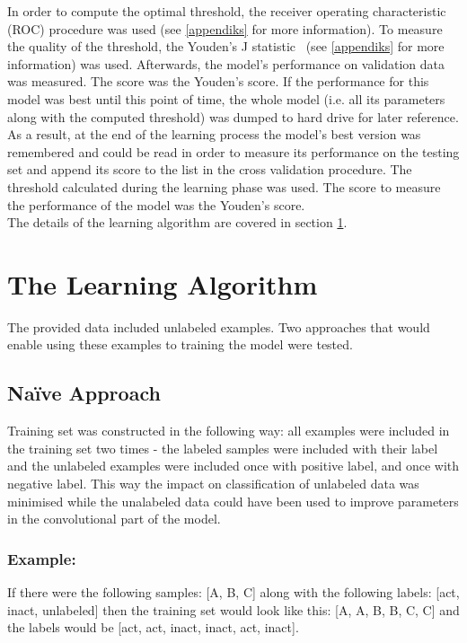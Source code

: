 \documentclass[a4paper,10pt]{report}
\begin{document}
	In order to compute the optimal threshold, the receiver operating characteristic (ROC) procedure was used (see \ref{appendiks} for more information). To measure the quality of the threshold, the Youden's J statistic~\cite{YOUDEN} (see \ref{appendiks} for more information) was used. Afterwards, the model's performance on validation data was measured. The score was the Youden's score. If the performance for this model was best until this point of time, the whole model (i.e. all its parameters along with the computed threshold) was dumped to hard drive for later reference. As a result, at the end of the learning process the model's best version was remembered and could be read in order to measure its performance on the testing set and append its score to the list in the cross validation procedure. The threshold calculated during the learning phase was used. The score to measure the performance of the model was the Youden's score.\\
	
	The details of the learning algorithm are covered in section \ref{sec:learning_algorithm}.	
	
      
    \section{The Learning Algorithm}\label{sec:learning_algorithm} 
    The provided data included unlabeled examples. Two approaches that would enable using these examples to training the model were tested.\\
    
      \subsection{Na\"{i}ve Approach}
      Training set was constructed in the following way: all examples were included in the training set two times - the labeled samples were included with their label and the unlabeled examples were included once with positive label, and once with negative label. This way the impact on classification of unlabeled data was minimised while the unalabeled data could have been used to improve parameters in the convolutional part of the model.\\
	  
      \subsubsection{Example:}
      If there were the following samples: [A, B, C] along with the following labels: [act, inact, unlabeled] then the training set would look like this: [A, A, B, B, C, C] and the labels would be [act, act, inact, inact, act, inact].\\
      
\end{document}
